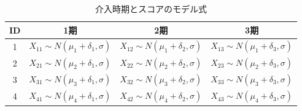 \begin{table}[ht]
	\centering
	\caption{介入時期とスコアのモデル式}
	\begin{tabular}{cccc}
		ID & 1期                                    & 2期                                    & 3期                                    \\\hline
		1  & $X_{11}\sim N(\mu_1+\delta_1,\sigma)$ & $X_{12}\sim N(\mu_1+\delta_2,\sigma)$ & $X_{13}\sim N(\mu_1+\delta_3,\sigma)$ \\
		2  & $X_{21}\sim N(\mu_2+\delta_1,\sigma)$ & $X_{22}\sim N(\mu_2+\delta_2,\sigma)$ & $X_{23}\sim N(\mu_2+\delta_3,\sigma)$ \\
		3  & $X_{31}\sim N(\mu_3+\delta_1,\sigma)$ & $X_{32}\sim N(\mu_3+\delta_2,\sigma)$ & $X_{33}\sim N(\mu_3+\delta_3,\sigma)$ \\
		4  & $X_{41}\sim N(\mu_4+\delta_1,\sigma)$ & $X_{42}\sim N(\mu_4+\delta_2,\sigma)$ & $X_{43}\sim N(\mu_4+\delta_3,\sigma)$ \\\hline
	\end{tabular}
	\label{tbl:22_03}
\end{table}
